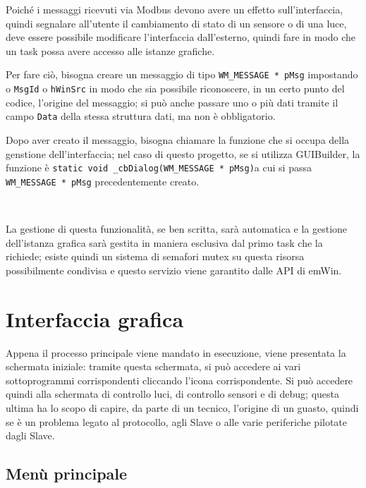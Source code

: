 \documentclass[a4paper,titlepage]{book}
\newcommand{\code}{\lstinline}
\begin{document}
Poiché i messaggi ricevuti via Modbus devono avere un effetto sull'interfaccia, quindi segnalare all'utente il cambiamento di stato di un sensore o di una luce, deve essere possibile modificare l'interfaccia dall'esterno, quindi fare in modo che un task possa avere accesso alle istanze grafiche.

Per fare ciò, bisogna creare un messaggio di tipo \code!WM_MESSAGE * pMsg! impostando o \code!MsgId! o \code!hWinSrc! in modo che sia possibile riconoscere, in un certo punto del codice, l'origine del messaggio; si può anche passare uno o più dati tramite il campo \code!Data! della stessa struttura dati, ma non è obbligatorio.

Dopo aver creato il messaggio, bisogna chiamare la funzione che si occupa della genstione dell'interfaccia; nel caso di questo progetto, se si utilizza GUIBuilder, la funzione è \newline \code!static void _cbDialog(WM_MESSAGE * pMsg)!\newline a cui si passa \code!WM_MESSAGE * pMsg! precedentemente creato.

~

La gestione di questa funzionalità, se ben scritta, sarà automatica e la gestione dell'istanza grafica sarà gestita in maniera esclusiva dal primo task che la richiede; esiste quindi un sistema di semafori mutex su questa risorsa possibilmente condivisa e questo servizio viene garantito dalle API di emWin.

\section{Interfaccia grafica}

Appena il processo principale viene mandato in esecuzione, viene presentata la schermata iniziale: tramite questa schermata, si può accedere ai vari sottoprogrammi corrispondenti cliccando l'icona corrispondente. Si può accedere quindi alla schermata di controllo luci, di controllo sensori e di debug; questa ultima ha lo scopo di capire, da parte di un tecnico, l'origine di un guasto, quindi se è un problema legato al protocollo, agli Slave o alle varie periferiche pilotate dagli Slave. 


\subsection{Menù principale}
\end{document}
